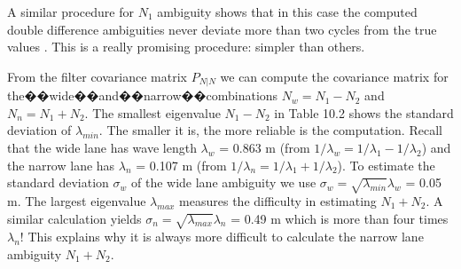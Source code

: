A similar procedure for $N_{1}$ ambiguity shows that in this case the computed double difference ambiguities never deviate more than two cycles from the true values . This is a really promising procedure: simpler than others.

From the filter covariance matrix $P_{N|N}$ we can compute the covariance matrix for the��wide��and��narrow��combinations $N_{w}=N_{1}-N_{2}$ and $N_{n}=N_{1}+N_{2}$. The smallest eigenvalue $N_{1}-N_{2}$ in Table 10.2 shows the standard deviation of $\lambda_{min}$. The smaller it is, the more reliable is the computation. Recall that the wide lane has wave length $\lambda_{w}$ = 0.863 m (from  $1/\lambda_{w}=1/\lambda_{1}-1/\lambda_{2}$) and the narrow lane has $\lambda_{n}$ = 0.107 m (from $1/\lambda_{n}=1/\lambda_{1}+1/\lambda_{2}$). To estimate the standard deviation $\sigma_{w}$ of the wide lane ambiguity we use $\sigma_{w}=\sqrt{\lambda_{min}}\lambda_{w}$ = 0.05 m. The largest eigenvalue $\lambda_{max}$ measures the difficulty in estimating $N_{1}+N_{2}$. A similar calculation yields $\sigma_{n}=\sqrt{\lambda_{max}}\lambda_{n}$ = 0.49 m which is more than four times $\lambda_{n}$! This explains why it is always more difficult to calculate the narrow lane ambiguity $N_{1}+N_{2}$.

